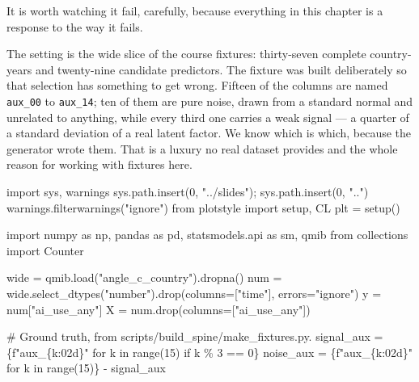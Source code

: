 \documentclass[
  letterpaper,
  10pt,
  twoside,
  openright,
  numbers=noenddot,
  chapterprefix=true]{scrbook}
\newenvironment{Shaded}{}{}
\newcommand{\BuiltInTok}[1]{\textcolor[rgb]{0.84,0.23,0.29}{#1}}
\newcommand{\CommentTok}[1]{\textcolor[rgb]{0.42,0.45,0.49}{#1}}
\newcommand{\ControlFlowTok}[1]{\textcolor[rgb]{0.84,0.23,0.29}{#1}}
\newcommand{\DecValTok}[1]{\textcolor[rgb]{0.00,0.36,0.77}{#1}}
\newcommand{\ImportTok}[1]{\textcolor[rgb]{0.01,0.18,0.38}{#1}}
\newcommand{\KeywordTok}[1]{\textcolor[rgb]{0.84,0.23,0.29}{#1}}
\newcommand{\NormalTok}[1]{\textcolor[rgb]{0.14,0.16,0.18}{#1}}
\newcommand{\OperatorTok}[1]{\textcolor[rgb]{0.14,0.16,0.18}{#1}}
\newcommand{\SpecialCharTok}[1]{\textcolor[rgb]{0.00,0.36,0.77}{#1}}
\newcommand{\SpecialStringTok}[1]{\textcolor[rgb]{0.01,0.18,0.38}{#1}}
\newcommand{\StringTok}[1]{\textcolor[rgb]{0.01,0.18,0.38}{#1}}
\begin{document}
It is worth watching it fail, carefully, because everything in this
chapter is a response to the way it fails.

The setting is the wide slice of the course fixtures: thirty-seven
complete country-years and twenty-nine candidate predictors. The fixture
was built deliberately so that selection has something to get wrong.
Fifteen of the columns are named \texttt{aux\_00} to \texttt{aux\_14};
ten of them are pure noise, drawn from a standard normal and unrelated
to anything, while every third one carries a weak signal --- a quarter
of a standard deviation of a real latent factor. We know which is which,
because the generator wrote them. That is a luxury no real dataset
provides and the whole reason for working with fixtures here.

\label{check-stepwise}
\begin{Shaded}
\begin{Highlighting}[]
\ImportTok{import}\NormalTok{ sys, warnings}
\NormalTok{sys.path.insert(}\DecValTok{0}\NormalTok{, }\StringTok{"../slides"}\NormalTok{)}\OperatorTok{;}\NormalTok{ sys.path.insert(}\DecValTok{0}\NormalTok{, }\StringTok{".."}\NormalTok{)}
\NormalTok{warnings.filterwarnings(}\StringTok{"ignore"}\NormalTok{)}
\ImportTok{from}\NormalTok{ plotstyle }\ImportTok{import}\NormalTok{ setup, CL}
\NormalTok{plt }\OperatorTok{=}\NormalTok{ setup()}

\ImportTok{import}\NormalTok{ numpy }\ImportTok{as}\NormalTok{ np, pandas }\ImportTok{as}\NormalTok{ pd, statsmodels.api }\ImportTok{as}\NormalTok{ sm, qmib}
\ImportTok{from}\NormalTok{ collections }\ImportTok{import}\NormalTok{ Counter}

\NormalTok{wide }\OperatorTok{=}\NormalTok{ qmib.load(}\StringTok{"angle\_c\_country"}\NormalTok{).dropna()}
\NormalTok{num }\OperatorTok{=}\NormalTok{ wide.select\_dtypes(}\StringTok{"number"}\NormalTok{).drop(columns}\OperatorTok{=}\NormalTok{[}\StringTok{"time"}\NormalTok{], errors}\OperatorTok{=}\StringTok{"ignore"}\NormalTok{)}
\NormalTok{y }\OperatorTok{=}\NormalTok{ num[}\StringTok{"ai\_use\_any"}\NormalTok{]}
\NormalTok{X }\OperatorTok{=}\NormalTok{ num.drop(columns}\OperatorTok{=}\NormalTok{[}\StringTok{"ai\_use\_any"}\NormalTok{])}

\CommentTok{\# Ground truth, from scripts/build\_spine/make\_fixtures.py.}
\NormalTok{signal\_aux }\OperatorTok{=}\NormalTok{ \{}\SpecialStringTok{f"aux\_}\SpecialCharTok{\{}\NormalTok{k}\SpecialCharTok{:02d\}}\SpecialStringTok{"} \ControlFlowTok{for}\NormalTok{ k }\KeywordTok{in} \BuiltInTok{range}\NormalTok{(}\DecValTok{15}\NormalTok{) }\ControlFlowTok{if}\NormalTok{ k }\OperatorTok{\%} \DecValTok{3} \OperatorTok{==} \DecValTok{0}\NormalTok{\}}
\NormalTok{noise\_aux }\OperatorTok{=}\NormalTok{ \{}\SpecialStringTok{f"aux\_}\SpecialCharTok{\{}\NormalTok{k}\SpecialCharTok{:02d\}}\SpecialStringTok{"} \ControlFlowTok{for}\NormalTok{ k }\KeywordTok{in} \BuiltInTok{range}\NormalTok{(}\DecValTok{15}\NormalTok{)\} }\OperatorTok{{-}}\NormalTok{ signal\_aux}


\end{Highlighting}
\end{Shaded}
\end{document}
